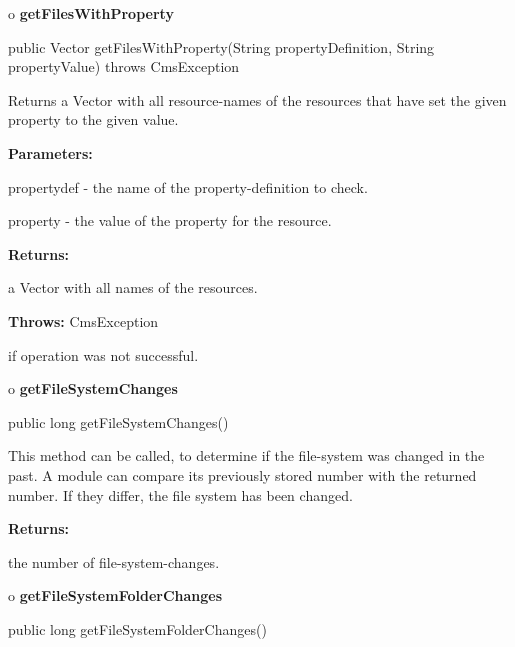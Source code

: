 o {\bf getFilesWithProperty} 

\begin{PRE}
 public Vector getFilesWithProperty(String propertyDefinition,
                                    String propertyValue) throws CmsException
\end{PRE}

\begin{description}
\htmlDD Returns a Vector with all resource-names of the resources that have
set the given property to the given value. 

\begin{description}
\item {\bf Parameters:}  

propertydef - the name of the property-definition to check.  

property - the value of the property for the resource.  
\item {\bf Returns:}  

a Vector with all names of the resources.  
\item {\bf Throws:} CmsException  

if operation was not successful.  
\end{description}

\end{description}

o {\bf getFileSystemChanges} 

\begin{PRE}
 public long getFileSystemChanges()
\end{PRE}

\begin{description}
\htmlDD This method can be called, to determine if the file-system was changed
in the past. \htmlBR
A module can compare its previously stored number with the returned number. If
they differ, the file system has been changed. 

\begin{description}
\item {\bf Returns:}  

the number of file-system-changes.  
\end{description}

\end{description}

o {\bf getFileSystemFolderChanges} 

\begin{PRE}
 public long getFileSystemFolderChanges()
\end{PRE}

